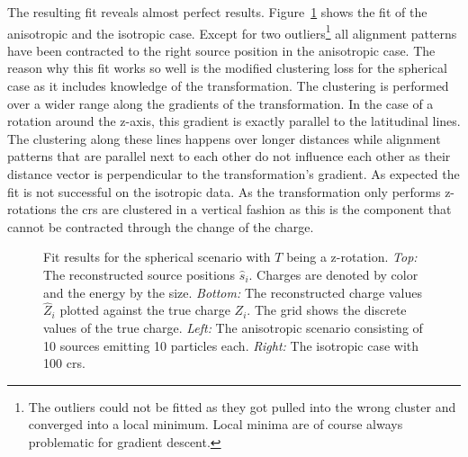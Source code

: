 The resulting fit reveals almost perfect results. Figure~\ref{fig:zrot-fit} shows the fit of the anisotropic and the isotropic case. Except for two outliers\footnote{The outliers could not be fitted as they got pulled into the wrong cluster and converged into a local minimum. Local minima are of course always problematic for gradient descent.} all alignment patterns have been contracted to the right source position in the anisotropic case. The reason why this fit works so well is the modified clustering loss for the spherical case as it includes knowledge of the transformation. The clustering is performed over a wider range along the gradients of the transformation. In the case of a rotation around the z-axis, this gradient is exactly parallel to the latitudinal lines. The clustering along these lines happens over longer distances while alignment patterns that are parallel next to each other do not influence each other as their distance vector is perpendicular to the transformation's gradient. As expected the fit is not successful on the isotropic data. As the transformation only performs z-rotations the \glspl{cr} are clustered in a vertical fashion as this is the component that cannot be contracted through the change of the charge.
\begin{figure}[ht!]
    \centering
    \begin{minipage}{0.49\textwidth}
    \end{minipage}
    \begin{minipage}{0.49\textwidth}
    \end{minipage}

    \begin{minipage}{0.49\textwidth}
    \end{minipage}
    \begin{minipage}{0.49\textwidth}
    \end{minipage}
    \caption{Fit results for the spherical scenario with \(T\) being a z-rotation. \emph{Top:} The reconstructed source positions \(\hat s_i\). Charges are denoted by color and the energy by the size. \emph{Bottom:} The reconstructed charge values \(\hat Z_i\) plotted against the true charge \(Z_i\). The grid shows the discrete values of the true charge. \emph{Left:} The anisotropic scenario consisting of 10 sources emitting 10 particles each. \emph{Right:} The isotropic case with 100 \glspl{cr}.}\label{fig:zrot-fit}
\end{figure}

